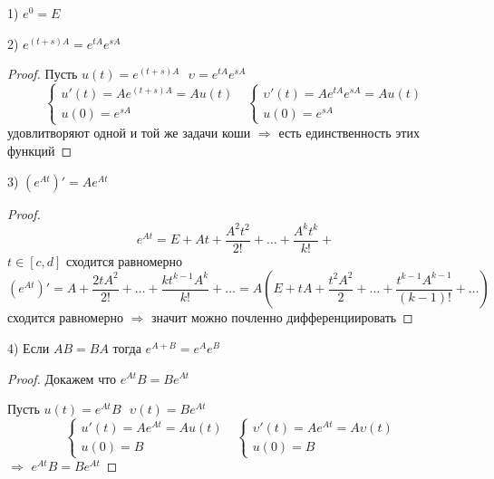 \begin{block}[Свойства]
  1) $e^0 = E$

  2) $e^{(t+s)A} = e^{tA} e^{sA}$

  \begin{proof}
    Пусть $u(t) = e^{(t+s)A} ~~~ \upsilon = e^{tA} e^{sA}$
    $$
    \left\{
    \begin{array}{l}
      u'(t) = A e^{(t+s)A} = Au(t) \\
      u(0) = e^{sA}
    \end{array}
    \right. ~~~
    \left\{
    \begin{array}{l}
      \upsilon'(t) = A e^{tA} e^{sA}= Au(t) \\
      u(0) = e^{sA}
    \end{array}
    \right.
    $$
    удовлитворяют одной и той же задачи коши $\Rightarrow$ есть единственность
    этих функций
  \end{proof}

  3) $(e^{At})' = A e^{At}$

  \begin{proof}
    $$
    e^{At} = E + At + \frac{A^2t^2}{2!} + \ldots + \frac{A^k t^k}{k!} +
    $$
    $t \in [c,d]$ сходится равномерно
    $$
    (e^{At})' = A + \frac{2tA^2}{2!} + \ldots + \frac{kt^{k-1}A^k}{k!} +
    \ldots = A\left(E + tA + \frac{t^2A^2}{2} + \ldots +
    \frac{t^{k-1}A^{k-1}}{(k-1)!} + \ldots\right)
    $$
    сходится равномерно $\Rightarrow$ значит можно почленно дифференциировать
  \end{proof}

  4) Если $AB = BA$ тогда $e^{A+B} = e^A e^B$

  \begin{proof}
    Докажем что $e^{At}B = Be^{At}$

    Пусть $u(t) = e^{At}B ~~~ \upsilon(t) = Be^{At}$
    $$
    \left\{
    \begin{array}{l}
      u'(t) = A e^{At} = Au(t) \\
      u(0) = B
    \end{array}
    \right. ~~~
    \left\{
    \begin{array}{l}
      \upsilon'(t) = A e^{At} = A\upsilon(t) \\
      u(0) = B
    \end{array}
    \right. ~~~
    $$
    $\Rightarrow$ $e^{At}B = Be^{At}$


\end{proof}
\end{block}
